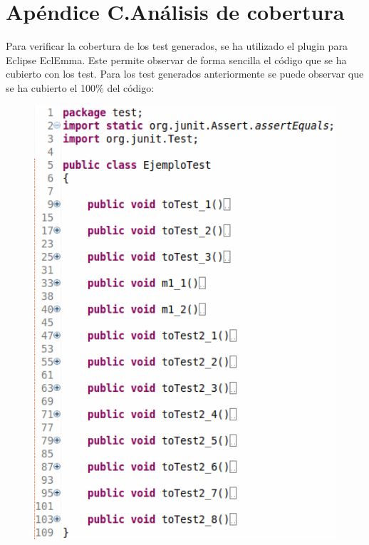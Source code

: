 \documentclass{llncs}
\begin{document}
    
\section*{Apéndice C.\enspace Análisis de cobertura}
Para verificar la cobertura de los test generados, se ha utilizado el plugin para Eclipse EclEmma. Este permite observar de forma sencilla el código que se ha cubierto
con los test. Para los test generados anteriormente se puede observar que se ha cubierto el 100\% del código:   
\begin{figure}[hbt!]
  \centering
  \begin{minipage}[H]{0.3\textwidth}
  \centering
  \includegraphics[width=1.7\textwidth]{screenshots/testGenerados}\\
\end{minipage}
\begin{minipage}[H]{0.55\textwidth}

\end{minipage}
\end{figure}
\end{document}
